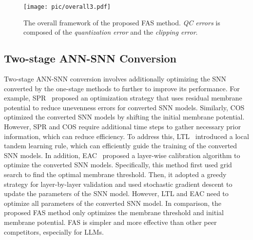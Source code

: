\begin{figure}[!t]
\vskip 0.1in
    \centering
    \texttt{[image: pic/overall3.pdf]}
    \caption{The overall framework of the proposed FAS method. \textit{QC errors} is composed of the \textit{quantization error} and the \textit{clipping error}.}
    \vskip -0.1in
    \label{fig3}
\end{figure}

\subsection{Two-stage ANN-SNN Conversion}
Two-stage ANN-SNN conversion involves additionally optimizing the SNN converted by the one-stage methods to further to improve its performance. For example, SPR~\cite{hao2023reducing} proposed an optimization strategy that uses residual membrane potential to reduce unevenness errors for converted SNN models. Similarly, COS~\cite{Hao2023BridgingTG} optimized the converted SNN models by shifting the initial membrane potential. However, SPR and COS require additional time steps to gather necessary prior information, which can reduce efficiency. To address this, LTL~\cite{yang2022training} introduced a local tandem learning rule, which can efficiently guide the training of the converted SNN models. In addition, EAC~\cite{li2024error} proposed a layer-wise calibration algorithm to optimize the converted SNN models. Specifically, this method first used grid search to find the optimal membrane threshold. Then, it adopted a greedy strategy for layer-by-layer validation and used stochastic gradient descent to update the parameters of the SNN model. However, LTL and EAC need to optimize all parameters of the converted SNN model. In comparison, the proposed FAS method only optimizes the membrane threshold and initial membrane potential. FAS is simpler and more effective than other peer competitors, especially for LLMs.


